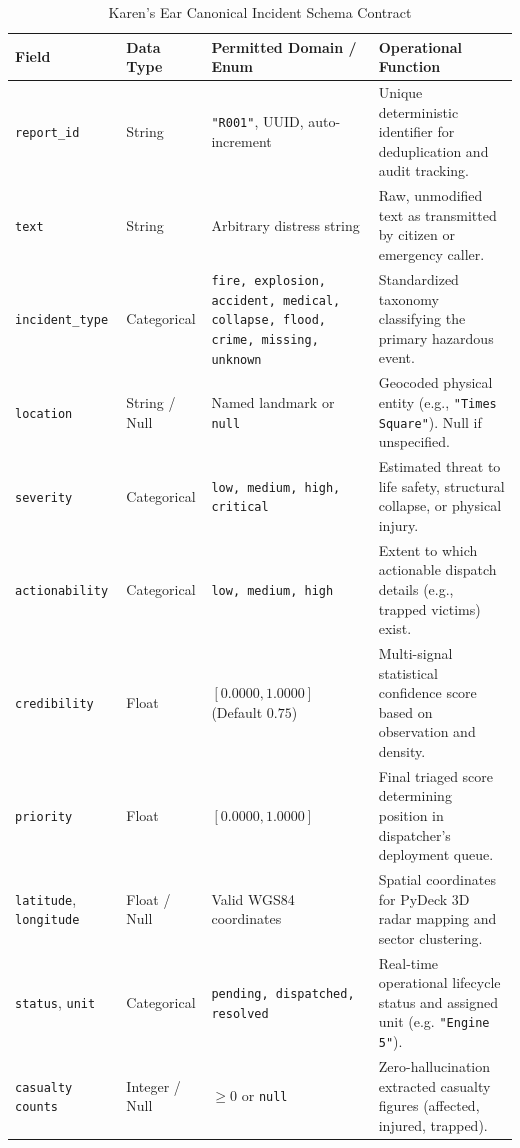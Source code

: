 \documentclass[10pt,a4paper]{article}
\begin{document}
\begin{table}[htbp]
  \centering
  \small
  \caption{Karen's Ear Canonical Incident Schema Contract}
  \label{tab:schema_definition}
  \begin{tabularx}{\textwidth}{lp{2.1cm}p{4.2cm}X}
    \toprule
    \textbf{Field} & \textbf{Data Type} & \textbf{Permitted Domain / Enum} & \textbf{Operational Function} \\
    \midrule
    \texttt{report\_id} & String & \texttt{"R001"}, UUID, auto-increment & Unique deterministic identifier for deduplication and audit tracking. \\
    \texttt{text} & String & Arbitrary distress string & Raw, unmodified text as transmitted by citizen or emergency caller. \\
    \texttt{incident\_type} & Categorical & \texttt{fire, explosion, accident, medical, collapse, flood, crime, missing, unknown} & Standardized taxonomy classifying the primary hazardous event. \\
    \texttt{location} & String / Null & Named landmark or \texttt{null} & Geocoded physical entity (e.g., \texttt{"Times Square"}). Null if unspecified. \\
    \texttt{severity} & Categorical & \texttt{low, medium, high, critical} & Estimated threat to life safety, structural collapse, or physical injury. \\
    \texttt{actionability} & Categorical & \texttt{low, medium, high} & Extent to which actionable dispatch details (e.g., trapped victims) exist. \\
    \texttt{credibility} & Float & $[0.0000, 1.0000]$ (Default $0.75$) & Multi-signal statistical confidence score based on observation and density. \\
    \texttt{priority} & Float & $[0.0000, 1.0000]$ & Final triaged score determining position in dispatcher's deployment queue. \\
    \texttt{latitude}, \texttt{longitude} & Float / Null & Valid WGS84 coordinates & Spatial coordinates for PyDeck 3D radar mapping and sector clustering. \\
    \texttt{status}, \texttt{unit} & Categorical & \texttt{pending, dispatched, resolved} & Real-time operational lifecycle status and assigned unit (e.g. \texttt{"Engine 5"}). \\
    \texttt{casualty counts} & Integer / Null & $\ge 0$ or \texttt{null} & Zero-hallucination extracted casualty figures (affected, injured, trapped). \\
    \bottomrule
  \end{tabularx}
\end{table}
\end{document}

